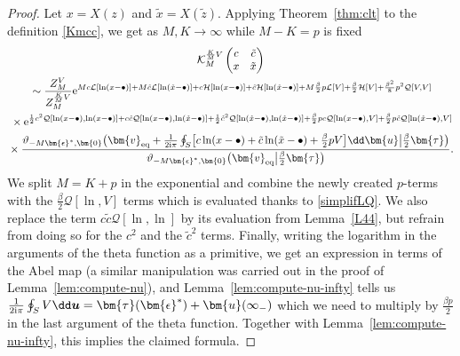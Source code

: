 \documentclass[10pt,a4paper]{amsart}
\numberwithin{equation}{section}
\begin{document}
\begin{proof}
Let $x = X(z)$ and $\tilde{x} = X(\tilde{z})$. Applying
 Theorem~\ref{thm:clt} to the definition \eqref{Kmcc}, we get as $M,K \rightarrow \infty$ while $ M - K = p$ is fixed
 \begin{gather*}
	 \mathcal{K}^{\frac{K}{M}V}_{M}\left(\begin{matrix} c & \tilde{c} \\ x & \tilde{x} \end{matrix}\right) \\
{} \sim \frac{Z^{V}_{M}}{Z^{\frac{K}{M}V}_{M}}{\rm e}^{Mc\mathcal{L}[\ln(x - \bullet)] + M\tilde{c}\mathcal{L}[\ln(\tilde{x} - \bullet)] + c\mathcal{H}[\ln(x - \bullet)] + \tilde{c}\mathcal{H}[\ln(\tilde{x} - \bullet)] + M\frac{\beta}{2}p\mathcal{L}[V] + \frac{\beta}{2}\mathcal{H}[V] + \frac{\beta^2}{8}p^2\mathcal{Q}[V,V]} \\
 {}\times{\rm e}^{ \frac{1}{2}c^2 \mathcal{Q}[\ln(x - \bullet),\ln(x - \bullet)] + c \tilde{c} \mathcal{Q}[\ln(x - \bullet),\ln(\tilde{x} - \bullet)] + \frac{1}{2}\tilde{c}^2\mathcal{Q}[\ln(\tilde{x} - \bullet),\ln(\tilde{x} - \bullet)]+\frac{\beta}{2}pc \mathcal{Q}[\ln(x - \bullet),V] + \frac{\beta}{2}p\tilde{c}\mathcal{Q}[\ln(\tilde{x} - \bullet),V]}\! \\
 {}\times \frac{\vartheta_{-M\bm{\epsilon}^{*}, \bm{0}}\bigl(\bm{v}_{{\rm eq}} + \frac{1}{2{\rm i}\pi} \oint_{S}\bigl[c\ln(x - \bullet) + \tilde{c}\ln(\tilde{x} - \bullet) + \frac{\beta}{2}p V\bigr] \dd \bm{u} \big| \frac{\beta}{2}\bm{\tau}\bigr)}{\vartheta_{-M\bm{\epsilon}^{*},\bm{0}}\bigl(\bm{v}_{{\rm eq}}\big|\frac{\beta}{2}\bm{\tau}\bigr)}.
\end{gather*}
We split $M = K + p$ in the exponential and combine the newly created
$p$-terms with the $\frac{\beta}{2}\mathcal{Q}[\ln,V]$ terms which is
evaluated thanks to \eqref{simplifLQ}. We also replace the term
$c\tilde{c}\mathcal{Q}[\ln,\ln]$ by its evaluation from
Lemma~\ref{L44}, but refrain from doing so for the $c^2$ and the
$\tilde{c}^2$ terms. Finally, writing the logarithm in the arguments of the
theta function as a primitive, we get an expression in terms of the
Abel map (a similar manipulation was carried out in the proof of Lemma~\ref{lem:compute-nu}), and Lemma~\ref{lem:compute-nu-infty} tells us $\frac{1}{2{\rm i}\pi} \oint_{S} V \dd \boldsymbol{u} = \bm{\tau}(\bm{\epsilon}^*) + \bm{u}(\infty_-)$ which we need to multiply by $\frac{\beta p}{2}$ in the last argument of the theta function. Together with Lemma~\ref{lem:compute-nu-infty},
this implies the claimed formula.
\end{proof}
\end{document}

